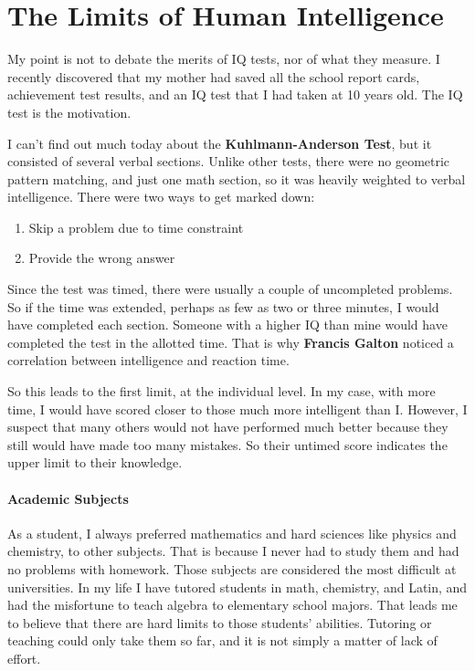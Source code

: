 \section{The Limits of Human Intelligence}

My point is not to debate the merits of IQ tests, nor of what they measure. I recently discovered that my mother had saved all the school report cards, achievement test results, and an IQ test that I had taken at 10 years old. The IQ test is the motivation.

I can't find out much today about the \textbf{Kuhlmann-Anderson Test}, but it consisted of several verbal sections. Unlike other tests, there were no geometric pattern matching, and just one math section, so it was heavily weighted to verbal intelligence. There were two ways to get marked down:

\begin{enumerate}


\item Skip a problem due to time constraint

\item Provide the wrong answer
\end{enumerate}


Since the test was timed, there were usually a couple of uncompleted problems. So if the time was extended, perhaps as few as two or three minutes, I would have completed each section. Someone with a higher IQ than mine would have completed the test in the allotted time. That is why \textbf{Francis Galton} noticed a correlation between intelligence and reaction time.

So this leads to the first limit, at the individual level. In my case, with more time, I would have scored closer to those much more intelligent than I. However, I suspect that many others would not have performed much better because they still would have made too many mistakes. So their untimed score indicates the upper limit to their knowledge.

\paragraph{Academic Subjects}


As a student, I always preferred mathematics and hard sciences like physics and chemistry, to other subjects. That is because I never had to study them and had no problems with homework. Those subjects are considered the most difficult at universities. In my life I have tutored students in math, chemistry, and Latin, and had the misfortune to teach algebra to elementary school majors. That leads me to believe that there are hard limits to those students' abilities. Tutoring or teaching could only take them so far, and it is not simply a matter of lack of effort.

